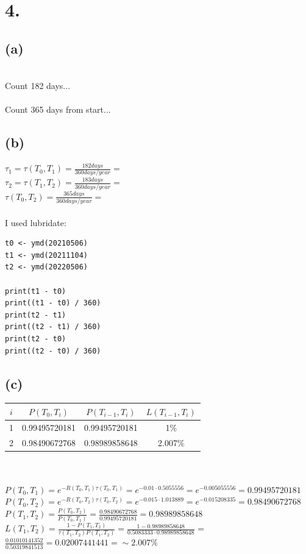 \documentclass{article}
\begin{document}
\section*{4.}
{\Large 

\subsection*{(a)}

 \\ 
Count 182 days... \\  
 \\
Count 365 days from start... \\

\subsection*{(b)}

$\tau_1 = \tau(T_0, T_1) = \frac{182 days}{360 days / year} = $  \\
$\tau_2 = \tau(T_1, T_2) = \frac{183 days}{360 days / year} = $  \\
$\tau(T_0, T_2) = \frac{365 days}{360 days / year} = $  \\ \\
I used lubridate:
\begin{verbatim}
t0 <- ymd(20210506)
t1 <- ymd(20211104)
t2 <- ymd(20220506)

print(t1 - t0)
print((t1 - t0) / 360)
print(t2 - t1)
print((t2 - t1) / 360)
print(t2 - t0)
print((t2 - t0) / 360)
\end{verbatim}

\subsection*{(c)}

\begin{tabular}{ | c | c | c | c |}
	\hline
		$i$ & $P(T_0, T_i)$ & $P(T_{i-1}, T_i)$ & $L(T_{i-1}, T_i)$ \\
  \hline
		1 & 0.99495720181 & 0.99495720181 & 1\% \\
  \hline
		2 & 0.98490672768 & 0.98989858648 & 2.007\% \\
	\hline
\end{tabular} \\ \\
$P(T_0, T_1) = e^{-R(T_0, T_1)\tau(T_0, T_1)} = e^{-0.01 \cdot 0.5055556} = e^{-0.005055556} = 0.99495720181$ \\
$P(T_0, T_2) = e^{-R(T_0, T_2)\tau(T_0, T_2)} = e^{-0.015 \cdot 1.013889} = e^{-0.015208335} = 0.98490672768$ \\
$P(T_1, T_2) = \frac{P(T_0, T_2)}{P(T_0, T_1)} = \frac{0.98490672768}{0.99495720181} = 0.98989858648$ \\
$L(T_1, T_2) = \frac{1 - P(T_1, T_2)}{\tau(T_1, T_2) P(T_1, T_2)} = \frac{1 - 0.98989858648}{0.5083333 \cdot 0.98989858648}$ = $\frac{0.01010141352}{0.50319841513} = 0.02007441441 = \sim 2.007\%$

}
\end{document}
